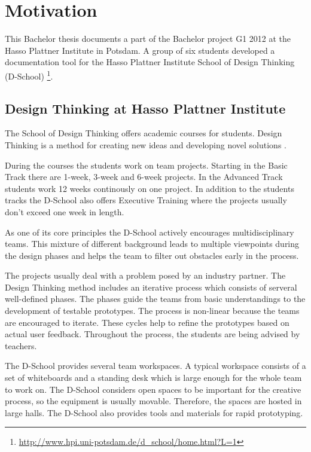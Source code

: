 \chapter{Motivation}

This Bachelor thesis documents a part of the Bachelor project G1 2012 at the Hasso Plattner Institute in Potsdam. A group of six students developed a documentation tool for the Hasso Plattner Institute School of Design Thinking (D-School) \footnote{\url{http://www.hpi.uni-potsdam.de/d_school/home.html?L=1}}. 

\section{Design Thinking at Hasso Plattner Institute}
The School of Design Thinking offers academic courses for students. Design Thinking is a method for creating new ideas and  developing novel solutions \cite{Plattner_2009}. 

During the courses the students work on team projects. Starting in the Basic Track there are 1-week, 3-week and 6-week projects. In the Advanced Track students work 12 weeks continously on one project. In addition to the students tracks the D-School also offers Executive Training where the projects usually don't exceed one week in length. 

As one of its core principles the D-School actively encourages multidisciplinary teams. This mixture of different background leads to multiple viewpoints during the design phases and helps the team to filter out obstacles early in the process. 

The projects usually deal with a problem posed by an industry partner. The Design Thinking method includes an iterative process which consists of serveral well-defined phases. The phases guide the teams from basic understandings to the development of testable prototypes. The process is non-linear because the teams are encouraged to iterate. These cycles help to refine the prototypes based on actual user feedback. Throughout the process, the students are being advised by teachers. 

The D-School provides several team workspaces. A typical workspace consists of a set of whiteboards and a standing desk which is large enough for the whole team to work on. The D-School considers open spaces to be important for the creative process, so the equipment is usually movable. Therefore, the spaces are hosted in large halls. The D-School also provides tools and materials for rapid prototyping.

